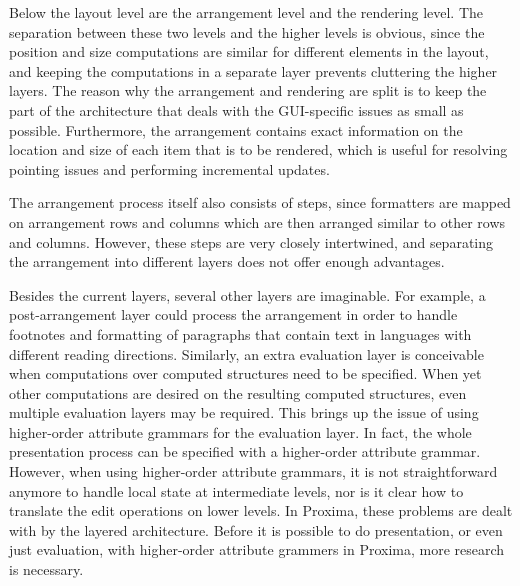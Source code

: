 Below the layout level are the arrangement level and the rendering level. The separation between these two levels and the higher levels is obvious, since the position and size computations are similar for different elements in the layout, and keeping the computations in a separate layer prevents cluttering the higher layers. The reason why the arrangement and rendering are split is to keep the part of the architecture that deals with the GUI-specific issues as small as possible. Furthermore, the arrangement contains exact information on the location and size of each item that is to be rendered, which is useful for resolving pointing issues and performing incremental updates. 

The arrangement process itself also consists of steps, since formatters are mapped on arrangement rows and columns which are then arranged similar to other rows and columns. However, these steps are very closely intertwined, and separating the arrangement into different layers does not offer enough advantages. 

Besides the current layers, several other layers are imaginable. For example, a post-arrangement layer could process the arrangement in order to handle footnotes and formatting of paragraphs that contain text in languages with different reading directions. Similarly, an extra evaluation layer is conceivable when computations over computed structures need to be specified. When yet other computations are desired on the resulting computed structures, even multiple evaluation layers may be required. This brings up the issue of using higher-order attribute grammars for the evaluation layer. In fact, the whole presentation process can be specified with a higher-order attribute grammar. However, when using higher-order attribute grammars, it is not straightforward anymore to handle local state at intermediate levels, nor is it clear how to translate the edit operations on lower levels. In Proxima, these problems are dealt with by the layered architecture. Before it is possible to do presentation, or even just evaluation, with higher-order attribute grammers in Proxima, more research is necessary.

